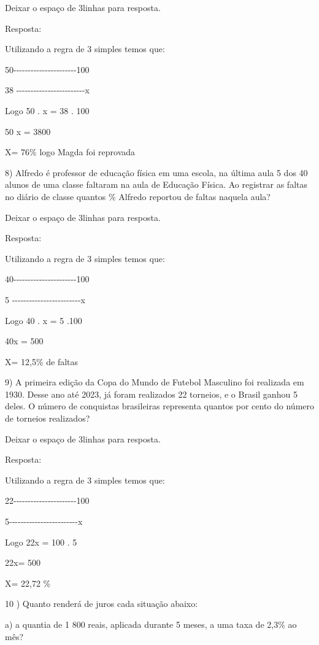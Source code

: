 Deixar o espaço de 3linhas para resposta.

Resposta:

Utilizando a regra de 3 simples temos que:

50-\/-\/-\/-\/-\/-\/-\/-\/-\/-\/-\/-\/-\/-\/-\/-\/-\/-\/-\/-\/-\/-100

38
-\/-\/-\/-\/-\/-\/-\/-\/-\/-\/-\/-\/-\/-\/-\/-\/-\/-\/-\/-\/-\/-\/-\/-x

Logo 50 . x = 38 . 100

50 x = 3800

X= 76\% logo Magda foi reprovada

8) Alfredo é professor de educação física em uma escola, na última aula
5 dos 40 alunos de uma classe faltaram na aula de Educação Física. Ao
registrar as faltas no diário de classe quantos \% Alfredo reportou de
faltas naquela aula?

Deixar o espaço de 3linhas para resposta.

Resposta:

Utilizando a regra de 3 simples temos que:

40-\/-\/-\/-\/-\/-\/-\/-\/-\/-\/-\/-\/-\/-\/-\/-\/-\/-\/-\/-\/-\/-100

5
-\/-\/-\/-\/-\/-\/-\/-\/-\/-\/-\/-\/-\/-\/-\/-\/-\/-\/-\/-\/-\/-\/-\/-x

Logo 40 . x = 5 .100

40x = 500

X= 12,5\% de faltas

9) A primeira edição da Copa do Mundo de Futebol Masculino foi realizada
em 1930. Desse ano até 2023, já foram realizados 22 torneios, e o Brasil
ganhou 5 deles. O número de conquistas brasileiras representa quantos
por cento do número de torneios realizados?

Deixar o espaço de 3linhas para resposta.

Resposta:

Utilizando a regra de 3 simples temos que:

22-\/-\/-\/-\/-\/-\/-\/-\/-\/-\/-\/-\/-\/-\/-\/-\/-\/-\/-\/-\/-\/-100

5-\/-\/-\/-\/-\/-\/-\/-\/-\/-\/-\/-\/-\/-\/-\/-\/-\/-\/-\/-\/-\/-\/-\/-x

Logo 22x = 100 . 5

22x= 500

X= 22,72 \%

10 ) Quanto renderá de juros cada situação abaixo:

a) a quantia de 1 800 reais, aplicada durante 5 meses, a uma taxa de
2,3\% ao mês?

